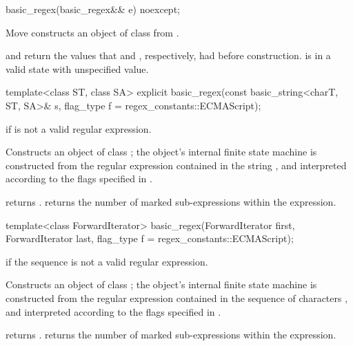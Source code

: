 %
\begin{itemdecl}
basic_regex(basic_regex&& e) noexcept;
\end{itemdecl}

\begin{itemdescr}
\pnum
\effects  Move constructs an object of class  from .

\pnum
\ensures {} and  return the values that
 and , respectively, had before construction.
 is in a valid state with unspecified value.
\end{itemdescr}

%
\begin{itemdecl}
template<class ST, class SA>
  explicit basic_regex(const basic_string<charT, ST, SA>& s,
                       flag_type f = regex_constants::ECMAScript);
\end{itemdecl}

\begin{itemdescr}
\pnum
\throws  {} if  is not a valid regular expression.

\pnum
\effects  Constructs an object of class ; the object's
internal finite state machine is constructed from the regular
expression contained in the string , and interpreted according to the
flags specified in .

\pnum\ensures
{} returns .
 returns the number of marked sub-expressions
within the expression.
\end{itemdescr}

%
\begin{itemdecl}
template<class ForwardIterator>
  basic_regex(ForwardIterator first, ForwardIterator last,
              flag_type f = regex_constants::ECMAScript);
\end{itemdecl}

\begin{itemdescr}
\pnum
\throws  {} if the sequence  is not a
valid regular expression.

\pnum
\effects  Constructs an object of class ; the object's
internal finite state machine is constructed from the regular
expression contained in the sequence of characters , and
interpreted according to the flags specified in .

\pnum\ensures
{} returns .
 returns the number of marked sub-expressions
within the expression.
\end{itemdescr}

